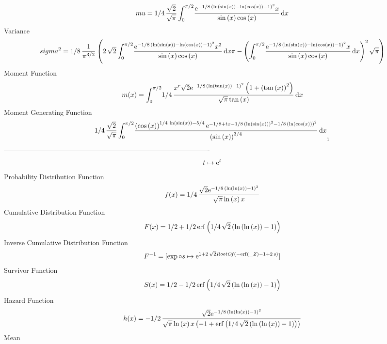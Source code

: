 \documentclass[12pt]{article}
\begin{document}
 $$ mu=1/4\,{\frac {\sqrt {2}}{\sqrt {\pi}}\int_{0}^{\pi/2}\!{\frac {{{\rm e}
^{-1/8\, \left( \ln  \left( \sin \left( x \right)  \right) -\ln 
 \left( \cos \left( x \right)  \right) -1 \right) ^{2}}}x}{\sin
 \left( x \right) \cos \left( x \right) }}\,{\rm d}x}
$$ Variance 
 $$ sigma^2 = 1/8\,{\frac {1}{{\pi}^{3/2}} \left( 2\,\sqrt {2}\int_{0}^{\pi/2}\!{
\frac {{{\rm e}^{-1/8\, \left( \ln  \left( \sin \left( x \right) 
 \right) -\ln  \left( \cos \left( x \right)  \right) -1 \right) ^{2}}}
{x}^{2}}{\sin \left( x \right) \cos \left( x \right) }}\,{\rm d}x\pi-
 \left( \int_{0}^{\pi/2}\!{\frac {{{\rm e}^{-1/8\, \left( \ln  \left( 
\sin \left( x \right)  \right) -\ln  \left( \cos \left( x \right) 
 \right) -1 \right) ^{2}}}x}{\sin \left( x \right) \cos \left( x
 \right) }}\,{\rm d}x \right) ^{2}\sqrt {\pi} \right) }
$$Moment Function 
 $$ m(x) = \int_{0}^{\pi/2}\!1/4\,{\frac {{x}^{r}\sqrt {2}{{\rm e}^{-1/8\,
 \left( \ln  \left( \tan \left( x \right)  \right) -1 \right) ^{2}}}
 \left( 1+ \left( \tan \left( x \right)  \right) ^{2} \right) }{\sqrt 
{\pi}\tan \left( x \right) }}\,{\rm d}x
$$ Moment Generating Function 
 $$1/4\,{\frac {\sqrt {2}}{\sqrt {\pi}}\int_{0}^{\pi/2}\!{\frac { \left( 
\cos \left( x \right)  \right) ^{1/4\,\ln  \left( \sin \left( x
 \right)  \right) -5/4}{{\rm e}^{-1/8+tx-1/8\, \left( \ln  \left( \sin
 \left( x \right)  \right)  \right) ^{2}-1/8\, \left( \ln  \left( \cos
 \left( x \right)  \right)  \right) ^{2}}}}{ \left( \sin \left( x
 \right)  \right) ^{3/4}}}\,{\rm d}x}_{{1}}
$$-------------------------------------------------------------------------------------------  \\$$t\mapsto {{\rm e}^{t}}
$$Probability Distribution Function 
$$  f(x)=1/4\,{\frac {\sqrt {2}{{\rm e}^{-1/8\, \left( \ln  \left( \ln  \left( 
x \right)  \right) -1 \right) ^{2}}}}{\sqrt {\pi}\ln  \left( x
 \right) x}}
$$Cumulative Distribution Function  
 $$F(x)=1/2+1/2\,{\rm erf} \left(1/4\,\sqrt {2} \left( \ln  \left( \ln 
 \left( x \right)  \right) -1 \right) \right)
$$ Inverse Cumulative Distribution Function 
  $$F^{-1} = [\exp\circ s\mapsto {{\rm e}^{1+2\,\sqrt {2}{\it RootOf} \left( -
{\rm erf} \left({\it \_Z}\right)-1+2\,s \right) }}]
$$Survivor Function 
 $$ S(x)=1/2-1/2\,{\rm erf} \left(1/4\,\sqrt {2} \left( \ln  \left( \ln 
 \left( x \right)  \right) -1 \right) \right)
$$ Hazard Function 
 $$ h(x)=-1/2\,{\frac {\sqrt {2}{{\rm e}^{-1/8\, \left( \ln  \left( \ln 
 \left( x \right)  \right) -1 \right) ^{2}}}}{\sqrt {\pi}\ln  \left( x
 \right) x \left( -1+{\rm erf} \left(1/4\,\sqrt {2} \left( \ln 
 \left( \ln  \left( x \right)  \right) -1 \right) \right) \right) }}
$$Mean 
\end{document}
